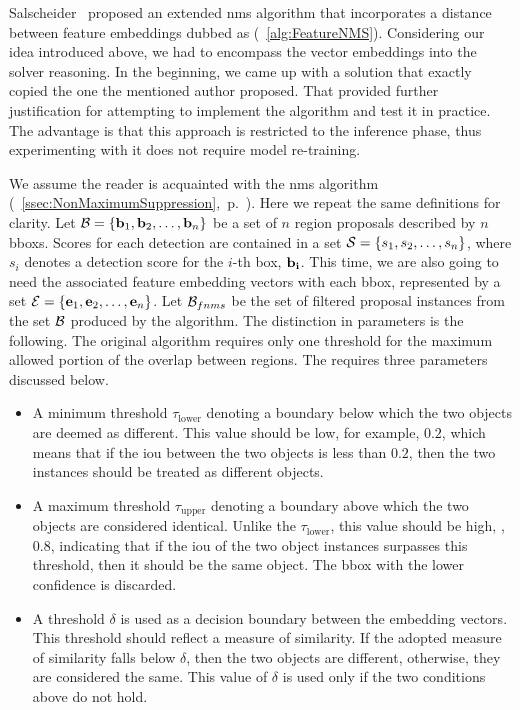 Salscheider~\cite{salscheider2020featurenms} proposed an extended \gls{nms} algorithm that incorporates a distance between feature embeddings dubbed as \featurenms{} (\algtext{}~\ref{alg:FeatureNMS}). Considering our idea introduced above, we had to encompass the vector embeddings into the solver reasoning. In the beginning, we came up with a solution that exactly copied the one the mentioned author proposed. That provided further justification for attempting to implement the algorithm and test it in practice. The advantage is that this approach is restricted to the inference phase, thus experimenting with it does not require model re-training.

\def\threshlower{\tau_{\text{lower}}}
\def\threshupper{\tau_{\text{upper}}}
\def\threshsim{\delta}

We assume the reader is acquainted with the \gls{nms} algorithm (\sectiontext{}~\ref{ssec:NonMaximumSuppression},~p.~\pageref{ssec:NonMaximumSuppression}). Here we repeat the same definitions for clarity. Let $\mathcal{B} = \left\{ {\mathbf{b}_1, \mathbf{b}_2, \dots, \mathbf{b}_n} \right\}$ be a set of $n$ region proposals described by $n$ \glspl{bbox}. Scores for each detection are contained in a set $\mathcal{S} = \left\{ {s_1, s_2, \dots, s_n} \right\}$, where $s_i$ denotes a detection score for the $i$-th box, $\mathbf{b_i}$. This time, we are also going to need the associated feature embedding vectors with each \gls{bbox}, represented by a set $\mathcal{E} = \left\{ {\mathbf{e}_1, \mathbf{e}_2, \dots, \mathbf{e}_n} \right\}$. Let $\mathcal{B}_{fnms}$ be  the set of filtered proposal instances from the set $\mathcal{B}$ produced by the \featurenms{} algorithm. The distinction in parameters is the following. The original algorithm requires only one threshold for the maximum allowed portion of the overlap between regions. The \featurenms{} requires three parameters discussed below.
\begin{itemize}
    \item A minimum threshold $\threshlower$ denoting a boundary below which the two objects are deemed as different. This value should be low, for example, $0.2$, which means that if the \gls{iou} between the two objects is less than $0.2$, then the two instances should be treated as different objects.
    \item A maximum threshold $\threshupper$ denoting a boundary above which the two objects are considered identical. Unlike the $\threshlower$, this value should be high, \egtext{}, $0.8$, indicating that if the \gls{iou} of the two object instances surpasses this threshold, then it should be the same object. The \gls{bbox} with the lower confidence is discarded.
    \item A threshold $\threshsim$ is used as a decision boundary between the embedding vectors. This threshold should reflect a measure of similarity. If the adopted measure of similarity falls below $\threshsim$, then the two objects are different, otherwise, they are considered the same. This value of $\threshsim$ is used only if the two conditions above do not hold.
\end{itemize}

